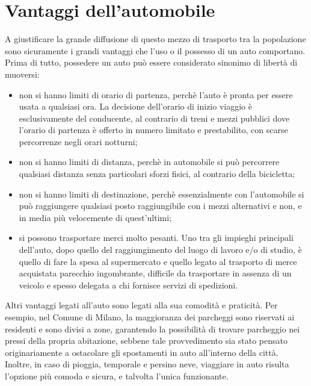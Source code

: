 \section{Vantaggi dell'automobile}

A giustificare la grande diffusione di questo mezzo di trasporto tra la popolazione sono sicuramente i grandi vantaggi che l'uso o il possesso di un auto comportano. Prima di tutto, possedere un auto può essere considerato sinonimo di libertà di muoversi:
\begin{itemize}
	\item non si hanno limiti di orario di partenza, perchè l'auto è pronta per essere usata a qualsiasi ora. La decisione dell'orario di inizio viaggio è esclusivamente del conducente, al contrario di treni e mezzi pubblici dove l'orario di partenza è offerto in numero limitato e prestabilito, con scarse percorrenze negli orari notturni;
	\item non si hanno limiti di distanza, perchè in automobile si può percorrere qualsiasi distanza senza particolari sforzi fisici, al contrario della bicicletta;
	\item non si hanno limiti di destinazione, perchè essenzialmente con l'automobile si può raggiungere qualsiasi posto raggiungibile con i mezzi alternativi e non, e in media più velocemente di quest'ultimi;
	\item si possono trasportare merci molto pesanti. Uno tra gli impieghi principali dell'auto, dopo quello del raggiungimento del luogo di lavoro e/o di studio, è quello di fare la spesa al supermercato e quello legato al trasporto di merce acquistata parecchio ingombrante, difficile da trasportare in assenza di un veicolo e spesso delegata a chi fornisce servizi di spedizioni.
\end{itemize}
Altri vantaggi legati all'auto sono legati alla sua comodità e praticità. Per esempio, nel Comune di Milano, la maggioranza dei parcheggi sono riservati ai residenti e sono divisi a zone, garantendo la possibilità di trovare parcheggio nei pressi della propria abitazione, sebbene tale provvedimento sia stato pensato originariamente a ostacolare gli spostamenti in auto all'interno della città. Inoltre, in caso di pioggia, temporale e persino neve, viaggiare in auto risulta l'opzione più comoda e sicura, e talvolta l'unica funzionante.























